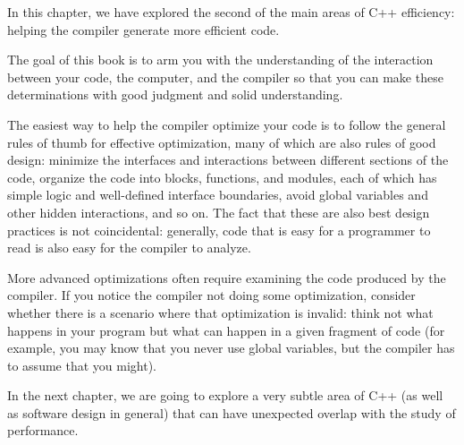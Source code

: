 In this chapter, we have explored the second of the main areas of C++ efficiency: helping the compiler generate more efficient code. 

The goal of this book is to arm you with the understanding of the interaction between your code, the computer, and the compiler so that you can make these determinations with good judgment and solid understanding. 

The easiest way to help the compiler optimize your code is to follow the general rules of thumb for effective optimization, many of which are also rules of good design: minimize the interfaces and interactions between different sections of the code, organize the code into blocks, functions, and modules, each of which has simple logic and well-defined interface boundaries, avoid global variables and other hidden interactions, and so on. The fact that these are also best design practices is not coincidental: generally, code that is easy for a programmer to read is also easy for the compiler to analyze.

More advanced optimizations often require examining the code produced by the compiler. If you notice the compiler not doing some optimization, consider whether there is a scenario where that optimization is invalid: think not what happens in your program but what can happen in a given fragment of code (for example, you may know that you never use global variables, but the compiler has to assume that you might). 

In the next chapter, we are going to explore a very subtle area of C++ (as well as software design in general) that can have unexpected overlap with the study of performance.